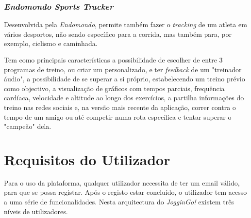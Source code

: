 \documentclass[twocolumn,twoside,10pt,a4paper]{article}
\begin{document}
\subsubsection{\emph{Endomondo Sports Tracker}}

Desenvolvida pela \textit{Endomondo}, permite também fazer o \textit{tracking} de um atleta em vários desportos, não sendo específico para a corrida, mas também para, por exemplo, ciclismo e caminhada.

Tem como principais características a possibilidade de escolher de entre 3 programas de treino, ou criar um personalizado, e ter \textit{feedback} de um "treinador áudio", a possibilidade de se superar a si próprio, estabelecendo um treino prévio como objectivo, a visualização de gráficos com tempos parciais, frequência cardíaca, velocidade e altitude ao longo dos exercícios, a partilha informações do treino nas redes sociais e, na versão mais recente da aplicação, correr contra o tempo de um amigo ou até competir numa rota específica e tentar superar o "campeão" dela.

\section{Requisitos do Utilizador}\label{sec:application}

Para o uso da plataforma, qualquer utilizador necessita de ter um email válido, para que se possa registar. Após o registo estar concluído, o utilizador tem acesso a uma série de funcionalidades. Nesta arquitectura do \textit{JogginGo!} existem três níveis de utilizadores.
\end{document}
